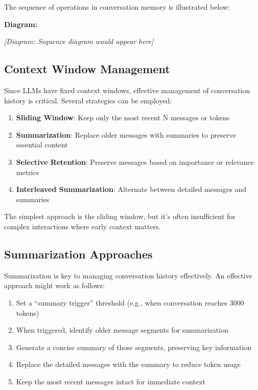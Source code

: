 \documentclass[11pt,oneside]{book}
\providecommand{\tightlist}{%
  \setlength{\itemsep}{0pt}\setlength{\parskip}{0pt}}
\begin{document}
The sequence of operations in conversation memory is illustrated below:

\textbf{Diagram:}

\emph{{[}Diagram: Sequence diagram would appear here{]}}

\subsection{Context Window Management}\label{context-window-management}

Since LLMs have fixed context windows, effective management of
conversation history is critical. Several strategies can be employed:

\begin{enumerate}
\def\labelenumi{\arabic{enumi}.}
\tightlist
\item
  \textbf{Sliding Window}: Keep only the most recent N messages or
  tokens
\item
  \textbf{Summarization}: Replace older messages with summaries to
  preserve essential content
\item
  \textbf{Selective Retention}: Preserve messages based on importance or
  relevance metrics
\item
  \textbf{Interleaved Summarization}: Alternate between detailed
  messages and summaries
\end{enumerate}

The simplest approach is the sliding window, but it's often insufficient
for complex interactions where early context matters.

\subsection{Summarization Approaches}\label{summarization-approaches}

Summarization is key to managing conversation history effectively. An
effective approach might work as follows:

\begin{enumerate}
\def\labelenumi{\arabic{enumi}.}
\tightlist
\item
  Set a ``summary trigger'' threshold (e.g., when conversation reaches
  3000 tokens)
\item
  When triggered, identify older message segments for summarization
\item
  Generate a concise summary of those segments, preserving key
  information
\item
  Replace the detailed messages with the summary to reduce token usage
\item
  Keep the most recent messages intact for immediate context
\end{enumerate}
\end{document}
